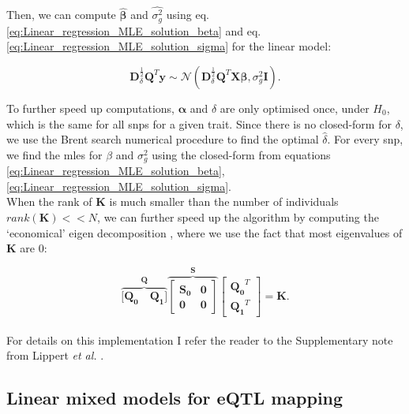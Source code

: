 Then, we can compute $\hat{\boldsymbol{\beta}}$ and $\hat{\sigma_g^2}$ using eq. \eqref{eq:Linear_regression_MLE_solution_beta} and eq. \eqref{eq:Linear_regression_MLE_solution_sigma} for the linear model:

\begin{equation}
    \mathbf{D}^{\frac{1}{2}}_{\delta}\mathbf{Q}^{T}\mathbf{y} \sim \mathcal{N}(\mathbf{D}^{\frac{1}{2}}_{\delta}\mathbf{Q}^{T}\mathbf{X}\boldsymbol{\beta}, \sigma_g^2\mathbf{I}).
\end{equation}


To further speed up computations, $\boldsymbol{\alpha}$ and $\delta$ are only optimised once, under $H_0$, which is the same for all \gls{snp}s for a given trait.
Since there is no closed-form for $\delta$, we use the Brent search numerical procedure \cite{goddard2009estimating} to find the optimal $\hat{\delta}$.
For every \gls{snp}, we find the \gls{mle}s for $\beta$ and $\sigma^2_g$ using the closed-form from equations \eqref{eq:Linear_regression_MLE_solution_beta},\eqref{eq:Linear_regression_MLE_solution_sigma}.\\

When the rank of $\mathbf{K}$ is much smaller than the number of individuals $rank(\mathbf{K}) << N$,  we can further speed up the algorithm by computing the `economical' eigen decomposition \cite{lippert2011fast}, where we use the fact that most eigenvalues of $\mathbf{K}$ are 0:

\begin{equation}\label{eq:economic_eigen_decomposition}
    \overbrace{[\mathbf{Q_0} \quad \mathbf{Q_1]}}^{\mathbf{Q}}
            \overbrace{\left[\begin{array}{cc}
                \mathbf{S_0} & \mathbf{0}\\
                        \mathbf{0} & \mathbf{0}
            \end{array}\right]}^{\mathbf{S}}
        \left[\begin{array}{c}
            \mathbf{Q_0}^T \\
            \mathbf{Q_1}^T
        \end{array}\right] = \mathbf{K}.
\end{equation}\\

For details on this implementation I refer the reader to the Supplementary note from Lippert \textit{et al.} \cite{lippert2011fast}.


\subsection{Linear mixed models for eQTL mapping}
\label{sec:fast_lmm}

